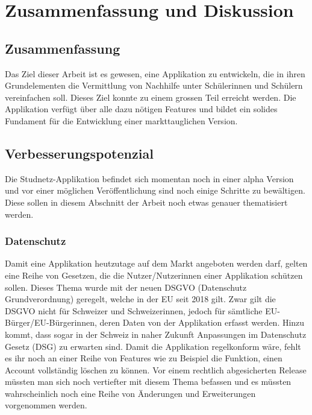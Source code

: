 \documentclass[../main.tex]{subfiles}
\begin{document}
	\chapter{Zusammenfassung und Diskussion}
	
	\section{Zusammenfassung}
	Das Ziel dieser Arbeit ist es gewesen, eine Applikation zu entwickeln, die in ihren Grundelementen die Vermittlung von Nachhilfe unter Schülerinnen und Schülern vereinfachen soll. Dieses Ziel konnte zu einem grossen Teil erreicht werden. Die Applikation verfügt über alle dazu nötigen Features und bildet ein solides Fundament für die Entwicklung einer markttauglichen Version.
	
	
	\section{Verbesserungspotenzial}
	Die Studnetz-Applikation befindet sich momentan noch in einer alpha Version und vor einer möglichen Veröffentlichung sind noch einige Schritte zu bewältigen. Diese sollen in diesem Abschnitt der Arbeit noch etwas genauer thematisiert werden.
	
	
	\subsection*{Datenschutz}
	Damit eine Applikation heutzutage auf dem Markt angeboten werden darf, gelten eine Reihe von Gesetzen, die die Nutzer/Nutzerinnen einer Applikation schützen sollen.  Dieses Thema wurde mit der neuen DSGVO (Datenschutz Grundverordnung) geregelt, welche in der EU seit 2018 gilt. Zwar gilt die DSGVO nicht für Schweizer und Schweizerinnen, jedoch für sämtliche EU-Bürger/EU-Bürgerinnen, deren Daten von der Applikation erfasst werden. Hinzu kommt, dass sogar in der Schweiz in naher Zukunft Anpassungen im Datenschutz Gesetz (DSG) zu erwarten sind. Damit die Applikation regelkonform wäre, fehlt es ihr noch an einer Reihe von Features wie zu Beispiel die Funktion, einen Account vollständig löschen zu können. Vor einem rechtlich abgesicherten Release müssten man sich noch vertiefter mit diesem Thema befassen und es müssten wahrscheinlich noch eine Reihe von Änderungen und Erweiterungen vorgenommen werden.  \cite{dsgvoschweiz}
	
\end{document}
